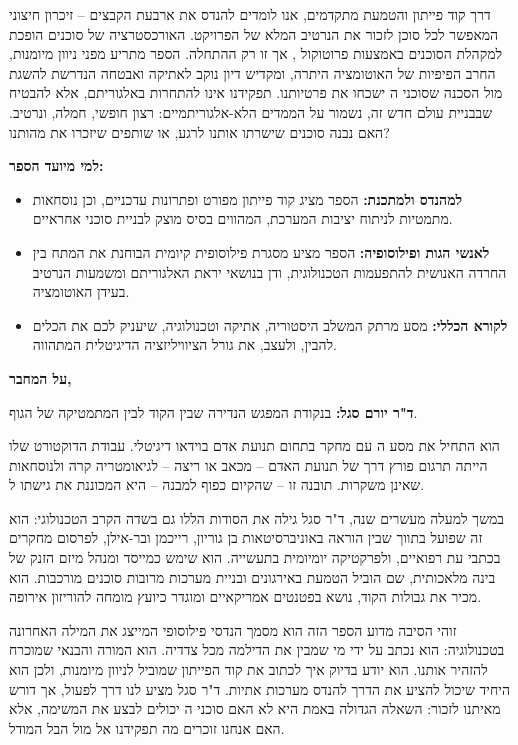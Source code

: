 \documentclass{hebrew-academic-template}
\begin{document}
דרך קוד פייתון והטמעת  מתקדמים, אנו לומדים להנדס את ארבעת הקבצים – זיכרון חיצוני המאפשר לכל סוכן לזכור את הנרטיב המלא של הפרויקט. האורכסטרציה של סוכנים הופכת למקהלת הסוכנים באמצעות פרוטוקול , אך זו רק ההתחלה. הספר מתריע מפני ניוון מיומנות, החרב הפיפיות של האוטומציה היתרה, ומקדיש דיון נוקב לאתיקה ואבטחה הנדרשת להשגת  מול הסכנה שסוכני ה ישכחו את פרטיותנו. תפקידנו אינו להתחרות באלגוריתם, אלא להבטיח שבבניית עולם חדש זה, נשמור על הממדים הלא-אלגוריתמיים: רצון חופשי, חמלה, ונרטיב. האם נבנה סוכנים שישרתו אותנו לרגע, או שותפים שיזכרו את מהותנו?

\textbf{למי מיועד הספר:}

\begin{itemize}
\item \textbf{למהנדס ולמתכנת:} הספר מציג קוד פייתון מפורט ופתרונות  עדכניים, וכן נוסחאות מתמטיות לניתוח יציבות המערכת, המהווים בסיס מוצק לבניית סוכני  אחראיים.
\item \textbf{לאנשי הגות ופילוסופיה:} הספר מציע מסגרת פילוסופית קיומית הבוחנת את המתח בין החרדה האנושית להתפעמות הטכנולוגית, ודן בנושאי יראת האלגוריתם ומשמעות הנרטיב בעידן האוטומציה.
\item \textbf{לקורא הכללי:} מסע מרתק המשלב היסטוריה, אתיקה וטכנולוגיה, שיעניק לכם את הכלים להבין, ולעצב, את גורל הציוויליזציה הדיגיטלית המתהווה.
\end{itemize}

\textbf{על המחבר,}

\textbf{ד"ר יורם סגל:} בנקודת המפגש הנדירה שבין הקוד לבין המתמטיקה של הגוף.

הוא התחיל את מסע ה עם מחקר בתחום תנועת אדם בוידאו דיגיטלי. עבודת הדוקטורט שלו הייתה תרגום פורץ דרך של תנועת האדם – מכאב או ריצה – לגיאומטריה קרה ולנוסחאות שאינן משקרות. תובנה זו – שהקיום כפוף למבנה – היא המכוננת את גישתו ל.

במשך למעלה מעשרים שנה, ד"ר סגל גילה את הסודות הללו גם בשדה הקרב הטכנולוגי: הוא זה שפועל בתווך שבין הוראה באוניברסיטאות בן גוריון, רייכמן ובר-אילן, לפרסום מחקרים בכתבי עת רפואיים, ולפרקטיקה יומיומית בתעשייה. הוא שימש כמייסד ומנהל מיזם הזנק של בינה מלאכותית, שם הוביל הטמעת  באירגונים ובניית מערכות מרובות סוכנים מורכבות. הוא מכיר את גבולות הקוד, נושא בפטנטים אמריקאיים ומוגדר כיועץ מומחה להוריזון אירופה.

זוהי הסיבה מדוע הספר הזה הוא מסמך הנדסי פילוסופי המייצג את המילה האחרונה בטכנולוגיה: הוא נכתב על ידי מי שמבין את הדילמה מכל צדדיה. הוא המורה והבנאי שמוכרח להזהיר אותנו. הוא יודע בדיוק איך לכתוב את קוד הפייתון שמוביל לניוון מיומנות, ולכן הוא היחיד שיכול להציע את הדרך להנדס מערכות אתיות. ד"ר סגל מציע לנו דרך לפעול, אך דורש מאיתנו לזכור: השאלה הגדולה באמת היא לא האם סוכני ה יכולים לבצע את המשימה, אלא האם אנחנו זוכרים מה תפקידנו אל מול הבל המודל.
\end{document}
